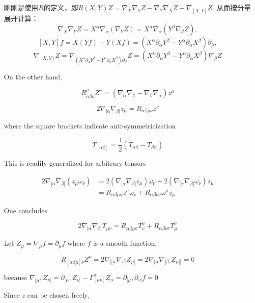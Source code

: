 \begin{remark}
    刚刚是使用$R$的定义，即$R(X,Y)Z=\nabla_X\nabla_YZ-\nabla_ Y\nabla_XZ-\nabla_{[X,Y]}Z$.
    从而按分量展开计算：
    \[\nabla_X\nabla_YZ=X^\alpha\nabla_\alpha(\nabla_YZ)=X^\alpha\nabla_\alpha(Y^\beta \nabla_\beta Z),\]
    \[[X,Y]f=X(Yf)-Y(Xf)=(X^\alpha\partial_\alpha Y^\beta-Y^\alpha\partial_\alpha X^\beta)\partial _\beta,\]
    \[\nabla_{[X,Y]}Z=\nabla_{(X^\alpha\partial_\alpha Y^\beta-Y^\alpha\partial_\alpha X^\beta)\partial _\beta}Z=(X^\alpha\partial_\alpha Y^\beta-Y^\alpha\partial_\alpha X^\beta)\nabla_\beta Z\]
\end{remark}

On the other hand,

\[
R_{\alpha\beta\nu}^{\mu}Z^\nu = (\nabla_\alpha \nabla_\beta - \nabla_\beta \nabla_\alpha) z^\mu
\]

\[
2\nabla_{[\alpha} \nabla_{\beta]} z_\mu = R_{\alpha\beta\mu\nu} z^\nu
\]

where the square brackets indicate anti-symmetricization

\[
T_{[\alpha\beta]} = \frac{1}{2} (T_{\alpha\beta} - T_{\beta\alpha})
\]

This is readily generalized for arbitrary tensors

\begin{equation*}
    \begin{aligned}
        2\nabla_{[\alpha} \nabla_{\beta]} (z_\mu \omega_\nu)& = 2 (\nabla_{[\alpha} \nabla_{\beta]} z_\mu) \omega_\nu + 2 (\nabla_{[\alpha} \nabla_{\beta]} \omega_\nu) z_\mu\\
&= R_{\alpha\beta\mu\sigma} z^\sigma \omega_\nu + R_{\alpha\beta\nu\sigma} \omega^\sigma z_\mu
    \end{aligned}
\end{equation*}
    

One concludes

\[
2\nabla_{[\alpha} \nabla_{\beta]} T_{\mu\nu} = R_{\alpha\beta\mu\sigma} T^\sigma_\nu + R_{\alpha\beta\nu\sigma} T_\mu^\sigma
\]

Let \( Z_\mu = \nabla_\mu f = \partial_\mu f \) where \( f \) is a smooth function.

\[
R_{[\alpha\beta\mu]\nu}Z^\nu = 2 \nabla_{[[\alpha}\nabla_{\beta]} Z_{\mu]} = 2 \nabla_{[\alpha}\nabla_{[\beta,} Z_{\mu]]} = 0
\]

because \(\nabla_{[\mu},Z_{\nu]} =\partial_{[\mu},Z_{\nu]} -\Gamma_{[\mu\nu]}^{\alpha}Z_\alpha=\partial_{[\mu},\partial_{\nu]}f=0\)

Since \(z\) can be chosen freely,

